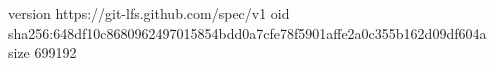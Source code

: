 version https://git-lfs.github.com/spec/v1
oid sha256:648df10c8680962497015854bdd0a7cfe78f5901affe2a0c355b162d09df604a
size 699192
